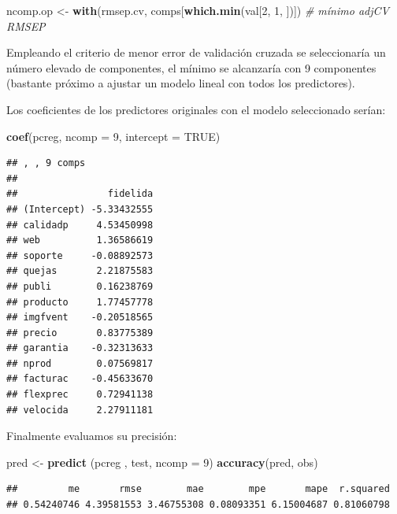 \documentclass[
  spanish,
]{book}
\newenvironment{Shaded}{\begin{snugshade}}{\end{snugshade}}
\newcommand{\CommentTok}[1]{\textcolor[rgb]{0.56,0.35,0.01}{\textit{#1}}}
\newcommand{\DataTypeTok}[1]{\textcolor[rgb]{0.13,0.29,0.53}{#1}}
\newcommand{\DecValTok}[1]{\textcolor[rgb]{0.00,0.00,0.81}{#1}}
\newcommand{\KeywordTok}[1]{\textcolor[rgb]{0.13,0.29,0.53}{\textbf{#1}}}
\newcommand{\NormalTok}[1]{#1}
\newcommand{\OtherTok}[1]{\textcolor[rgb]{0.56,0.35,0.01}{#1}}
\newcommand{\StringTok}[1]{\textcolor[rgb]{0.31,0.60,0.02}{#1}}
\theoremstyle{break}
\theoremstyle{definition}
\theoremstyle{definition}
\theoremstyle{definition}
\theoremstyle{remark}
\begin{document}
\begin{Shaded}
\begin{Highlighting}[]
\NormalTok{ncomp.op <-}\StringTok{ }\KeywordTok{with}\NormalTok{(rmsep.cv, comps[}\KeywordTok{which.min}\NormalTok{(val[}\DecValTok{2}\NormalTok{, }\DecValTok{1}\NormalTok{, ])]) }\CommentTok{# mínimo adjCV RMSEP}
\end{Highlighting}
\end{Shaded}

Empleando el criterio de menor error de validación cruzada se seleccionaría un número elevado de componentes, el mínimo se alcanzaría con 9 componentes (bastante próximo a ajustar un modelo lineal con todos los predictores).

Los coeficientes de los predictores originales con el modelo seleccionado serían:

\begin{Shaded}
\begin{Highlighting}[]
\KeywordTok{coef}\NormalTok{(pcreg, }\DataTypeTok{ncomp =} \DecValTok{9}\NormalTok{, }\DataTypeTok{intercept =} \OtherTok{TRUE}\NormalTok{)}
\end{Highlighting}
\end{Shaded}

\begin{verbatim}
## , , 9 comps
## 
##                fidelida
## (Intercept) -5.33432555
## calidadp     4.53450998
## web          1.36586619
## soporte     -0.08892573
## quejas       2.21875583
## publi        0.16238769
## producto     1.77457778
## imgfvent    -0.20518565
## precio       0.83775389
## garantia    -0.32313633
## nprod        0.07569817
## facturac    -0.45633670
## flexprec     0.72941138
## velocida     2.27911181
\end{verbatim}

Finalmente evaluamos su precisión:

\begin{Shaded}
\begin{Highlighting}[]
\NormalTok{pred <-}\StringTok{ }\KeywordTok{predict}\NormalTok{ (pcreg , test, }\DataTypeTok{ncomp =} \DecValTok{9}\NormalTok{)}
\KeywordTok{accuracy}\NormalTok{(pred, obs)}
\end{Highlighting}
\end{Shaded}

\begin{verbatim}
##         me       rmse        mae        mpe       mape  r.squared 
## 0.54240746 4.39581553 3.46755308 0.08093351 6.15004687 0.81060798
\end{verbatim}
\end{document}
